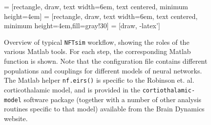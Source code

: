 \documentclass[12pt,a4paper]{article}
\newcommand{\type}[1]{{\small\small\tt #1} }
\newcommand{\NF}[0]{\type{NFTsim}}
\begin{document}
\begin{figure}[b]
\begin{center}
 = [rectangle, draw, text width=6em, text centered, minimum height=4em]
 = [rectangle, draw, text width=6em, text centered, minimum height=4em,fill=gray!30]
 = [draw, -latex']
\caption{Overview of typical \NF workflow, showing the roles of the various Matlab tools. For each step, the corresponding Matlab function is shown. Note that the configuration file contains different populations and couplings for different models of neural networks. The Matlab helper \type{nf.eirs()} is specific to the Robinson et. al. corticothalamic model, and is provided in the \type{cortiothalamic-model} software package (together with a number of other analysis routines specific to that model) available from the Brain Dynamics website.}
\label{fig:components}
\end{center}
\end{figure}
\end{document}
